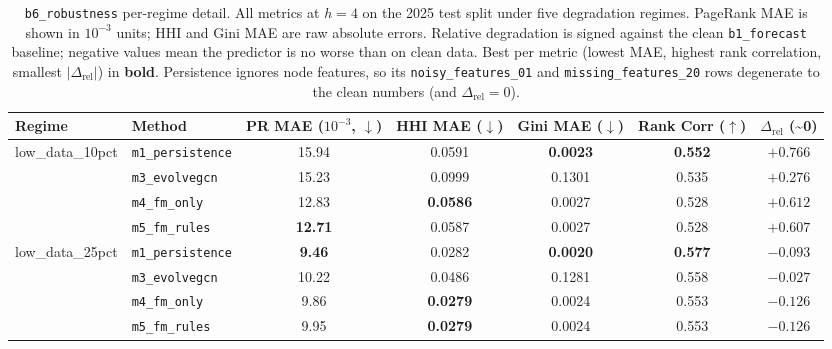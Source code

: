 \begin{table}[!htbp]
\centering
\footnotesize
\setlength{\tabcolsep}{4pt}
\caption{\texttt{b6\_robustness} per-regime detail. All metrics at $h{=}4$
on the 2025 test split under five degradation regimes. PageRank MAE is
shown in $10^{-3}$ units; HHI and Gini MAE are raw absolute errors.
Relative degradation is signed against the
clean \texttt{b1\_forecast} baseline; negative values mean the predictor is
no worse than on clean data. Best per metric (lowest MAE, highest rank
correlation, smallest $|\Delta_{\mathrm{rel}}|$) in \textbf{bold}.
Persistence ignores node features, so its \texttt{noisy\_features\_01} and
\texttt{missing\_features\_20} rows degenerate to the clean numbers (and
$\Delta_{\mathrm{rel}}=0$).}
\label{tab:b6_detail}
\begin{tabular}{l l c c c c c}
\toprule
Regime & Method & PR MAE ($10^{-3}$, $\downarrow$) & HHI MAE ($\downarrow$) & Gini MAE ($\downarrow$) & Rank Corr ($\uparrow$) & $\Delta_{\mathrm{rel}}$ (\textasciitilde 0) \\
\midrule
\multirow{4}{*}{low\_data\_10pct}
& \texttt{m1\_persistence} & 15.94          & 0.0591          & \textbf{0.0023} & \textbf{0.552} & $+0.766$ \\
& \texttt{m3\_evolvegcn}   & 15.23          & 0.0999          & 0.1301          & 0.535          & $\mathbf{+0.276}$ \\
& \texttt{m4\_fm\_only}    & 12.83          & \textbf{0.0586} & 0.0027          & 0.528          & $+0.612$ \\
& \texttt{m5\_fm\_rules}   & \textbf{12.71} & 0.0587          & 0.0027          & 0.528          & $+0.607$ \\
\midrule
\multirow{4}{*}{low\_data\_25pct}
& \texttt{m1\_persistence} & \textbf{9.46}  & 0.0282          & \textbf{0.0020} & \textbf{0.577} & $-0.093$ \\
& \texttt{m3\_evolvegcn}   & 10.22          & 0.0486          & 0.1281          & 0.558          & $\mathbf{-0.027}$ \\
& \texttt{m4\_fm\_only}    & 9.86           & \textbf{0.0279} & 0.0024          & 0.553          & $-0.126$ \\
& \texttt{m5\_fm\_rules}   & 9.95           & \textbf{0.0279} & 0.0024          & 0.553          & $-0.126$ \\

\end{tabular}
\end{table}
